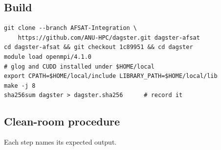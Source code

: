 \documentclass[11pt,a4paper]{article}
\begin{document}
\subsection{Build}
\begin{verbatim}
git clone --branch AFSAT-Integration \
    https://github.com/ANU-HPC/dagster.git dagster-afsat
cd dagster-afsat && git checkout 1c89951 && cd dagster
module load openmpi/4.1.0
# glog and CUDD installed under $HOME/local
export CPATH=$HOME/local/include LIBRARY_PATH=$HOME/local/lib
make -j 8
sha256sum dagster > dagster.sha256      # record it
\end{verbatim}

\subsection{Clean-room procedure}
Each step names its expected output.
\end{document}
